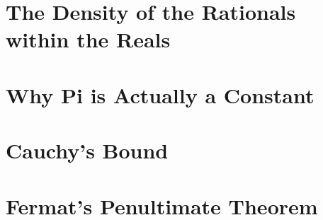\section{The Density of the Rationals within the Reals}



\newpage

\section{Why Pi is Actually a Constant}

%

\newpage


\section{Cauchy's Bound}

%

\newpage

\section{Fermat's Penultimate Theorem}

%

\newpage
